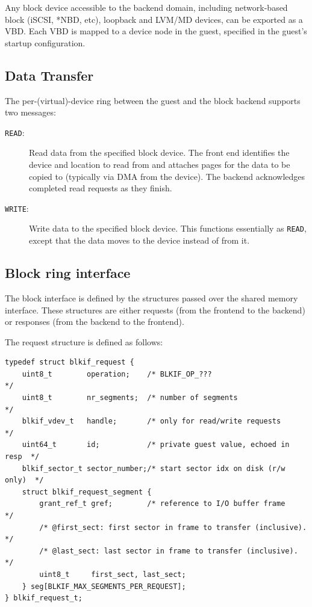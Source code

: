 \documentclass[11pt,twoside,final,openright]{report}
\begin{document}
Any block device accessible to the backend domain, including
network-based block (iSCSI, *NBD, etc), loopback and LVM/MD devices,
can be exported as a VBD.  Each VBD is mapped to a device node in the
guest, specified in the guest's startup configuration.

\subsection{Data Transfer}

The per-(virtual)-device ring between the guest and the block backend
supports two messages:

\begin{description}
\item [{\small {\tt READ}}:] Read data from the specified block
  device.  The front end identifies the device and location to read
  from and attaches pages for the data to be copied to (typically via
  DMA from the device).  The backend acknowledges completed read
  requests as they finish.

\item [{\small {\tt WRITE}}:] Write data to the specified block
  device.  This functions essentially as {\small {\tt READ}}, except
  that the data moves to the device instead of from it.
\end{description}


\subsection{Block ring interface}

The block interface is defined by the structures passed over the
shared memory interface.  These structures are either requests (from
the frontend to the backend) or responses (from the backend to the
frontend).

The request structure is defined as follows:

\scriptsize
\begin{verbatim}
typedef struct blkif_request {
    uint8_t        operation;    /* BLKIF_OP_???                         */
    uint8_t        nr_segments;  /* number of segments                   */
    blkif_vdev_t   handle;       /* only for read/write requests         */
    uint64_t       id;           /* private guest value, echoed in resp  */
    blkif_sector_t sector_number;/* start sector idx on disk (r/w only)  */
    struct blkif_request_segment {
        grant_ref_t gref;        /* reference to I/O buffer frame        */
        /* @first_sect: first sector in frame to transfer (inclusive).   */
        /* @last_sect: last sector in frame to transfer (inclusive).     */
        uint8_t     first_sect, last_sect;
    } seg[BLKIF_MAX_SEGMENTS_PER_REQUEST];
} blkif_request_t;
\end{verbatim}
\normalsize
\end{document}
